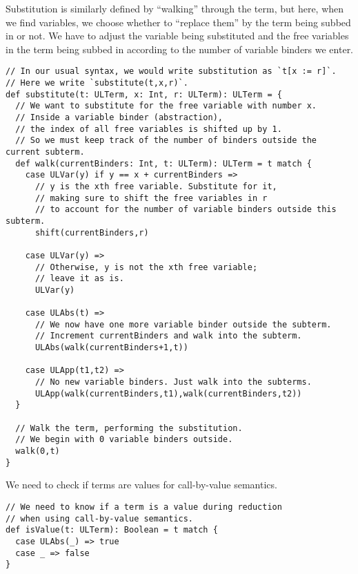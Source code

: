 \documentclass[11pt]{article}
\begin{document}
Substitution is similarly defined by “walking” through the term,
but here, when we find variables, we choose whether to “replace them”
by the term being subbed in or not.
We have to adjust the variable being substituted and the
free variables in the term being subbed in according to
the number of variable binders we enter.
\begin{verbatim}
// In our usual syntax, we would write substitution as `t[x := r]`.
// Here we write `substitute(t,x,r)`.
def substitute(t: ULTerm, x: Int, r: ULTerm): ULTerm = {
  // We want to substitute for the free variable with number x.
  // Inside a variable binder (abstraction),
  // the index of all free variables is shifted up by 1.
  // So we must keep track of the number of binders outside the current subterm.
  def walk(currentBinders: Int, t: ULTerm): ULTerm = t match {
    case ULVar(y) if y == x + currentBinders =>
      // y is the xth free variable. Substitute for it,
      // making sure to shift the free variables in r
      // to account for the number of variable binders outside this subterm.
      shift(currentBinders,r)
    
    case ULVar(y) =>
      // Otherwise, y is not the xth free variable;
      // leave it as is.
      ULVar(y)
    
    case ULAbs(t) =>
      // We now have one more variable binder outside the subterm.
      // Increment currentBinders and walk into the subterm.
      ULAbs(walk(currentBinders+1,t))

    case ULApp(t1,t2) =>
      // No new variable binders. Just walk into the subterms.
      ULApp(walk(currentBinders,t1),walk(currentBinders,t2))
  }

  // Walk the term, performing the substitution.
  // We begin with 0 variable binders outside.
  walk(0,t)
}
\end{verbatim}

We need to check if terms are values for call-by-value semantics.
\begin{verbatim}
// We need to know if a term is a value during reduction
// when using call-by-value semantics.
def isValue(t: ULTerm): Boolean = t match {
  case ULAbs(_) => true
  case _ => false
}
\end{verbatim}
\end{document}
